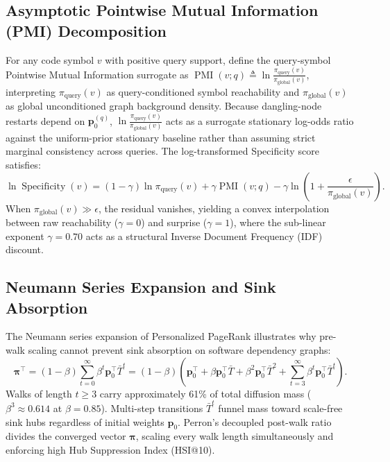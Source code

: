 \documentclass[10pt]{article}
\begin{document}
\subsection{Asymptotic Pointwise Mutual Information (PMI) Decomposition}
\label{prop:pmi_proof}
For any code symbol $v$ with positive query support, define the query-symbol Pointwise Mutual Information surrogate as $\operatorname{PMI}(v; q) \triangleq \ln \frac{\pi_{\text{query}}(v)}{\pi_{\text{global}}(v)}$, interpreting $\pi_{\text{query}}(v)$ as query-conditioned symbol reachability and $\pi_{\text{global}}(v)$ as global unconditioned graph background density. Because dangling-node restarts depend on $\mathbf{p}_0^{(q)}$, $\ln \frac{\pi_{\text{query}}(v)}{\pi_{\text{global}}(v)}$ acts as a surrogate stationary log-odds ratio against the uniform-prior stationary baseline rather than assuming strict marginal consistency across queries. The log-transformed Specificity score satisfies:
\begin{equation}
\ln \operatorname{Specificity}(v) = (1 - \gamma) \ln \pi_{\text{query}}(v) + \gamma \operatorname{PMI}(v; q) - \gamma \ln\!\left(1 + \frac{\epsilon}{\pi_{\text{global}}(v)}\right).
\end{equation}
When $\pi_{\text{global}}(v) \gg \epsilon$, the residual vanishes, yielding a convex interpolation between raw reachability ($\gamma=0$) and surprise ($\gamma=1$), where the sub-linear exponent $\gamma = 0.70$ acts as a structural Inverse Document Frequency (IDF) discount.

\subsection{Neumann Series Expansion and Sink Absorption}
\label{prop:neumann_proof}
The Neumann series expansion of Personalized PageRank illustrates why pre-walk scaling cannot prevent sink absorption on software dependency graphs:
\begin{equation}
\boldsymbol{\pi}^\top = (1-\beta)\sum_{t=0}^{\infty} \beta^t \mathbf{p}_0^\top \bar{T}^t = (1-\beta)\left(\mathbf{p}_0^\top + \beta \mathbf{p}_0^\top \bar{T} + \beta^2 \mathbf{p}_0^\top \bar{T}^2 + \sum_{t=3}^{\infty} \beta^t \mathbf{p}_0^\top \bar{T}^t\right).
\end{equation}
Walks of length $t \ge 3$ carry approximately 61\% of total diffusion mass ($\beta^3 \approx 0.614$ at $\beta=0.85$). Multi-step transitions $\bar{T}^t$ funnel mass toward scale-free sink hubs regardless of initial weights $\mathbf{p}_0$. Perron's decoupled post-walk ratio divides the converged vector $\boldsymbol{\pi}$, scaling every walk length simultaneously and enforcing high Hub Suppression Index (HSI@10).
\end{document}
